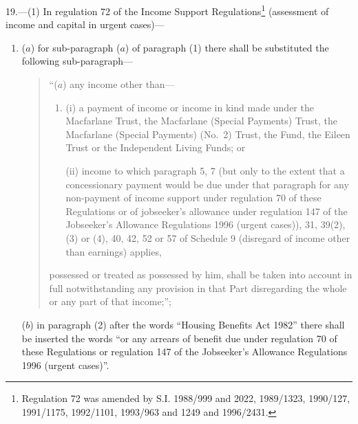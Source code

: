 \documentclass[12pt,a4paper]{article}
\begin{document}
19.---(1)  In regulation 72 of the Income Support Regulations\footnote{\frenchspacing Regulation 72 was amended by S.I. 1988/999 and 2022, 1989/1323, 1990/127, 1991/1175, 1992/1101, 1993/963 and 1249 and 1996/2431.} (assessment of income and capital in urgent cases)—
\begin{enumerate}\item[]
($a$) for sub-paragraph ($a$)  of paragraph (1) there shall be substituted the following sub-paragraph—
\begin{quotation}
“($a$) any income other than—
\begin{enumerate}\item[]
(i) a payment of income or income in kind made under the Macfarlane Trust, the Macfarlane (Special Payments) Trust, the Macfarlane (Special Payments) (No.\ 2) Trust, the Fund, the Eileen Trust or the Independent Living Funds; or

(ii) income to which paragraph 5, 7 (but only to the extent that a concessionary payment would be due under that paragraph for any non-payment of income support under regulation 70 of these Regulations or of jobseeker’s allowance under regulation 147 of the Jobseeker’s Allowance Regulations 1996 (urgent cases)), 31, 39(2), (3) or (4), 40, 42, 52 or 57 of Schedule 9 (disregard of income other than earnings) applies,
\end{enumerate}
possessed or treated as possessed by him, shall be taken into account in full notwithstanding any provision in that Part disregarding the whole or any part of that income;”;
\end{quotation}

($b$) in paragraph (2) after the words “Housing Benefits Act 1982” there shall be inserted the words “or any arrears of benefit due under regulation 70 of these Regulations or regulation 147 of the Jobseeker’s Allowance Regulations 1996 (urgent cases)”.
\end{enumerate}
\end{document}
